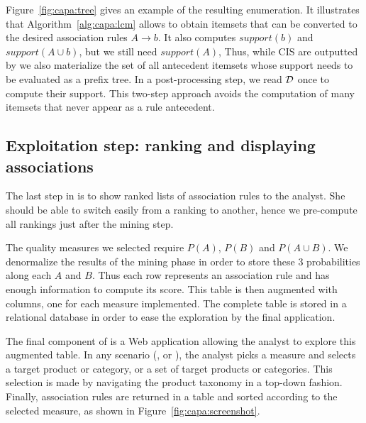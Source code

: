 

Figure~\ref{fig:capa:tree} gives an example of the resulting enumeration.
It illustrates that Algorithm~\ref{alg:capa:lcm} allows \capa to obtain itemsets
that can be converted to the desired association rules $A \rightarrow {b}$.
It also computes $\mathit{support}({b})$ and $\mathit{support}(A \cup {b})$,
but we still need $\mathit{support}(A)$,
Thus, while CIS are outputted by \jlcm we also materialize the set of all antecedent
itemsets whose support needs to be evaluated as a prefix tree.
In a post-processing step, we read $\cal D$ once to compute their support.
This two-step approach avoids the computation of many itemsets that never appear as a rule antecedent.






\subsection{Exploitation step: ranking and displaying associations}
\label{sec:capa:exploit}

The last step in \capa is to show ranked lists of association rules to the analyst.
She should be able to switch easily from a ranking to another,
hence we pre-compute all rankings just after the mining step.

The quality measures we selected require $P(A)$, $P(B)$ and $P(A \cup B)$. %
We denormalize the results of the mining phase in order to store these 3 probabilities along each $A$ and $B$.
Thus each row represents an association rule and has enough information to compute its score.
This table is then augmented with \nbm columns,
one for each measure implemented. %
The complete table is stored in a relational database
in order to ease the exploration by the final application.

The final component of \capa is a Web application allowing the analyst to explore this augmented table.
In any scenario (\demoassoc, \prodassocreceipt or \prodassocclient),
the analyst picks a measure and selects a target product or category, or a set of target products or categories.
This selection is made by navigating the product taxonomy in a top-down fashion.
Finally, association rules are returned in a table and sorted according to the selected measure,
as shown in Figure~\ref{fig:capa:screenshot}.

